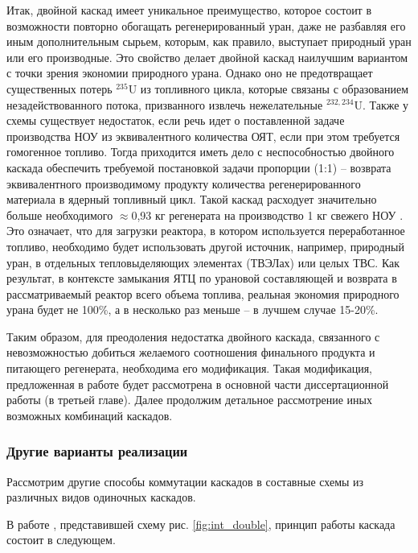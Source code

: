 Итак, двойной каскад имеет уникальное преимущество, которое состоит в возможности повторно обогащать регенерированный уран, даже не разбавляя его иным дополнительным сырьем, которым, как правило, выступает природный уран или его производные.
Это свойство делает двойной каскад наилучшим вариантом с точки зрения экономии природного урана.
Однако оно не предотвращает существенных потерь $^{235}$U из топливного цикла, которые связаны с образованием незадействованного потока, призванного извлечь нежелательные $^{232,234}$U.
Также у схемы существует недостаток, если речь идет о поставленной задаче производства НОУ из эквивалентного количества ОЯТ, если при этом требуется гомогенное топливо.
Тогда приходится иметь дело с неспособностью двойного каскада обеспечить требуемой постановкой задачи пропорции (1:1) -- возврата эквивалентного производимому продукту количества регенерированного материала в ядерный топливный цикл.
Такой каскад расходует значительно больше необходимого $\approx$0,93 кг регенерата на производство 1 кг свежего НОУ \cite{smirnovObogashchenieRegenerirovannogoUrana2018}.
Это означает, что для загрузки реактора, в котором используется переработанное топливо, необходимо будет использовать другой источник, например, природный уран, в отдельных тепловыделяющих элементах (ТВЭЛах) или целых ТВС. 
Как результат, в контексте замыкания ЯТЦ по урановой составляющей и возврата в рассматриваемый реактор всего объема топлива, реальная экономия природного урана будет не 100\%, а в несколько раз меньше -- в лучшем случае 15-20\%.

Таким образом, для преодоления недостатка двойного каскада, связанного с невозможностью добиться желаемого соотношения финального продукта и питающего регенерата, необходима его модификация.
Такая модификация, предложенная в работе \cite{smirnovObogashchenieRegenerirovannogoUrana2018}
будет рассмотрена в основной части диссертационной работы (в третьей главе).
Далее продолжим детальное рассмотрение иных возможных комбинаций каскадов.

\subsubsection{Другие варианты реализации}
Рассмотрим другие способы коммутации каскадов в составные схемы из различных видов одиночных каскадов.

В работе \cite{palkinPurificationReprocessedUranium2016}, представившей схему рис. \ref{fig:int_double}, принцип работы каскада состоит в следующем.

